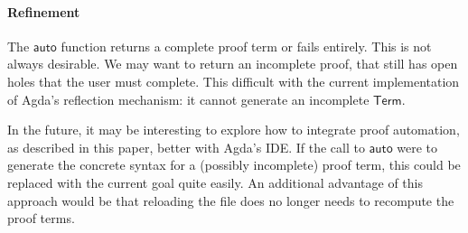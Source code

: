 \documentclass[preprint]{sigplanconf}
\newcommand{\Conid}[1]{\mathit{#1}}
\newcommand{\Varid}[1]{\mathit{#1}}
\renewcommand\Varid[1]{\mathord{\textsf{#1}}}
\let\Conid\Varid
\begin{document}

\paragraph{Refinement}
The \ensuremath{\Varid{auto}} function returns a complete proof term or fails
entirely. This is not always desirable. We may want to return an
incomplete proof, that still has open holes that the user must
complete. This difficult with the current implementation of Agda's
reflection mechanism: it cannot generate an incomplete \ensuremath{\Conid{Term}}.

In the future, it may be interesting to explore how to integrate proof
automation, as described in this paper, better with Agda's IDE. If the
call to \ensuremath{\Varid{auto}} were to generate the concrete syntax for a (possibly
incomplete) proof term, this could be replaced with the current goal
quite easily. An additional advantage of this approach would be that
reloading the file does no longer needs to recompute the proof terms.
\end{document}

